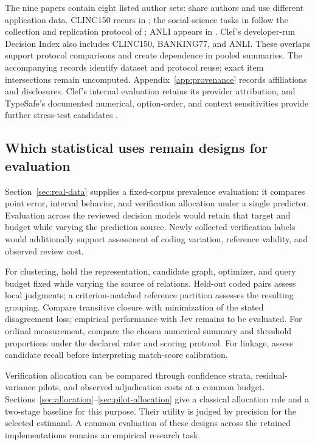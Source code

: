 \documentclass[11pt,a4paper]{article}
\begin{document}
The nine papers contain eight listed author sets: \citet{rafe2026,crash2026} share authors and use different application data. CLINC150 recurs in \citet{deusser2026,rafe2026,joy2026}; the social-science tasks in \citet{rafe2026} follow the collection and replication protocol of \citet{ibrahim2026}; ANLI appears in \citet{deusser2026,gao2026}. Clef's developer-run Decision Index also includes CLINC150, BANKING77, and ANLI. These overlaps support protocol comparisons and create dependence in pooled summaries. The accompanying records identify dataset and protocol reuse; exact item intersections remain uncomputed. Appendix~\ref{app:provenance} records affiliations and disclosures. Clef's internal evaluation retains its provider attribution, and TypeSafe's documented numerical, option-order, and context sensitivities provide further stress-test candidates \citep{cloudflare2026,typesafe-jagged}.

\subsection{Which statistical uses remain designs for evaluation}

Section~\ref{sec:real-data} supplies a fixed-corpus prevalence evaluation: it compares point error, interval behavior, and verification allocation under a single predictor. Evaluation across the reviewed decision models would retain that target and budget while varying the prediction source. Newly collected verification labels would additionally support assessment of coding variation, reference validity, and observed review cost.

For clustering, hold the representation, candidate graph, optimizer, and query budget fixed while varying the source of relations. Held-out coded pairs assess local judgments; a criterion-matched reference partition assesses the resulting grouping. Compare transitive closure with minimization of the stated disagreement loss; empirical performance with Jev remains to be evaluated. For ordinal measurement, compare the chosen numerical summary and threshold proportions under the declared rater and scoring protocol. For linkage, assess candidate recall before interpreting match-score calibration.

Verification allocation can be compared through confidence strata, residual-variance pilots, and observed adjudication costs at a common budget. Sections~\ref{sec:allocation}--\ref{sec:pilot-allocation} give a classical allocation rule and a two-stage baseline for this purpose. Their utility is judged by precision for the selected estimand. A common evaluation of these designs across the retained implementations remains an empirical research task.
\end{document}
